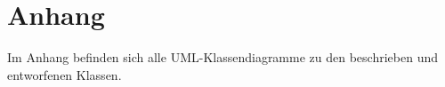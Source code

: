 \section{Anhang}
Im Anhang befinden sich alle UML-Klassendiagramme zu den beschrieben und entworfenen Klassen.